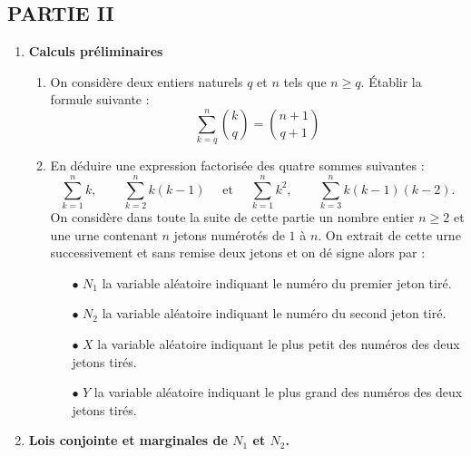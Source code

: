 \subsection*{PARTIE II}

\begin{enumerate}
\item \textbf{Calculs pr\'eliminaires}

\begin{enumerate}
\item On consid\`ere deux entiers naturels $q$ et $n$ tels que $n\geqslant q$. \'Etablir la formule
suivante :
\begin{equation*}
\sum\limits_{k=q}^{n}\binom{k}{q}=\binom{n+1}{q+1}
\end{equation*}

\item En d\'eduire une expression factoris\'ee des quatre
sommes suivantes :%
\begin{equation*}
\sum\limits_{k=1}^{n}k,\quad \quad \sum\limits_{k=2}^{n}k(k-1)\quad \text{ et } \quad
\sum\limits_{k=1}^{n}k^{2},\quad \quad \sum\limits_{k=3}^{n}k(k-1)(k-2).
\end{equation*}%
On consid\`ere dans toute la suite de cette partie un nombre entier $%
n\geqslant 2$ et une urne contenant $n$ jetons num\'erot\'es de $1$ \`a $n$.%
\newline
On extrait de cette urne successivement et sans remise deux jetons et on d\'e%
signe alors par :

\begin{itemize}
\item[$\bullet$] $N_{1}$ la variable al\'eatoire indiquant le num\'ero du premier jeton tir\'e.

\item[$\bullet$] $N_{2}$ la variable al\'eatoire indiquant le num\'ero du second jeton tir\'e.

\item[$\bullet$] $X$ la variable al\'eatoire indiquant le plus petit des num\'eros des deux
jetons tir\'es.

\item[$\bullet$] $Y$ la variable al\'eatoire indiquant le plus grand des num\'eros des deux
jetons tir\'es.
\end{itemize}


\end{enumerate}

\item \textbf{Lois conjointe et marginales de $N_{1}$ et $N_{2}$.}


\end{enumerate}
